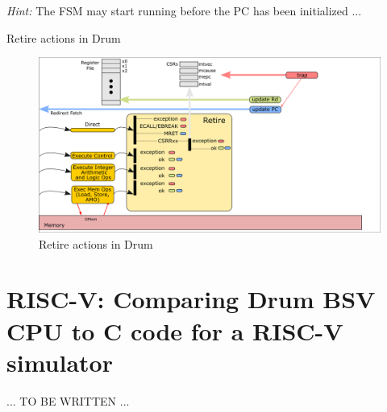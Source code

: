 \emph{Hint:} The FSM may start running before the PC has been initialized ...

\Endexercise

Retire actions in Drum

\begin{figure}[htbp]
  \centerline{\includegraphics[width=6in,angle=0]{Figures/Fig_Retire_Layers_1}}
  \caption{\label{Fig_Retire_Drum}Retire actions in Drum}
\end{figure}


\section{RISC-V: Comparing Drum BSV CPU to C code for a RISC-V simulator}

... TO BE WRITTEN ...

